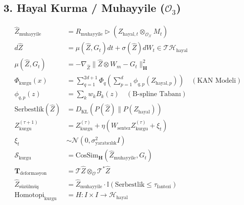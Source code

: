 \documentclass[11pt, a4paper]{article}
\begin{document}
\subsection{3. Hayal Kurma / Muhayyile ($\mathcal{O}_3$)}
\begin{align}
\hat{Z}_{\text{muhayyile}} &= R_{\text{muhayyile}} \triangleright \left( Z_{\text{hayal}, t} \otimes_{\mathcal{O}_{\mathcal{X}}} M_t \right) \\
d\hat{Z} &= \mu(\hat{Z}, G_t) dt + \sigma(\hat{Z}) dW_t \in \mathcal{T}\mathcal{H}_{\text{hayal}} \\
\mu(\hat{Z}, G_t) &= -\nabla_{\hat{Z}} \|\hat{Z} \otimes W_m - G_t\|_{\mathbf{H}}^2 \\
\Phi_{\text{kurgu}}(x) &= \sum_{q=1}^{2d+1} \Phi_q \left( \sum_{p=1}^d \phi_{q,p}(Z_{\text{hayal}, p}) \right) \quad (\text{KAN Modeli}) \\
\phi_{q,p}(z) &= \sum_k w_k B_k(z) \quad (\text{B-spline Tabanı}) \\
\text{Serbestlik}(\hat{Z}) &= D_{\text{KL}}\left( P(\hat{Z}) \parallel P(Z_{\text{hayal}}) \right) \\
Z_{\text{kurgu}}^{(\tau+1)} &= Z_{\text{kurgu}}^{(\tau)} + \eta \left( W_{\text{sentez}} Z_{\text{kurgu}}^{(\tau)} + \xi_t \right) \\
\xi_t &\sim \mathcal{N}\left( 0, \sigma_{\text{yaratıcılık}}^2 I \right) \\
\mathcal{S}_{\text{kurgu}} &= \text{CosSim}_{\mathbf{H}}(\hat{Z}_{\text{muhayyile}}, G_t) \\
\mathbf{T}_{\text{deformasyon}} &= \mathcal{T}\hat{Z} \otimes_{\mathcal{O}} \mathcal{T}^*\hat{Z} \\
\hat{Z}_{\text{süzülmüş}} &= \hat{Z}_{\text{muhayyile}} \cdot \mathbb{I}(\text{Serbestlik} \le \tau_{\text{fantezi}}) \\
\text{Homotopi}_{\text{kurgu}} &= H : I \times I \to \mathcal{H}_{\text{hayal}}
\end{align}
\end{document}
